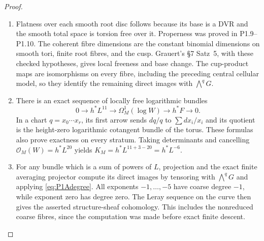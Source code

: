 \begin{proof}
\begin{enumerate}[label=\arabic*.]
\item Flatness over each smooth root disc follows because its base is a
DVR and the smooth total space is torsion free over it. Properness
was proved in P1.9--P1.10. The coherent fibre dimensions are the
constant binomial dimensions on smooth tori, finite root fibres,
and the cusp. Grauert's \S7 Satz~5, with these checked hypotheses,
gives local freeness and base change. The cup-product maps are
isomorphisms on every fibre, including the preceding central
cellular model, so they identify the remaining direct images with
$\bigwedge^qG$.

\item There is an exact sequence of locally free logarithmic bundles
\begin{equation}\label{eq:P1Alogcotangent}
0\longrightarrow h^*L^{11}\longrightarrow\Omega_M^1(\log W)
 \longrightarrow h^*F\longrightarrow0.
\end{equation}
In a chart $q=x_0\cdots x_r$, its first arrow sends
$dq/q$ to $\sum dx_i/x_i$ and its quotient is the height-zero
logarithmic cotangent bundle of the torus. These formulas also
prove exactness on every stratum. Taking determinants and
cancelling $\mathcal O_M(W)=h^*L^{20}$ yields
$K_M=h^*L^{11+3-20}=h^*L^{-6}$.

\item For any bundle which is a sum of powers of $L$, projection and
the exact finite averaging projector compute its direct images
by tensoring with $\bigwedge^qG$ and applying
\eqref{eq:P1Adegree}. All exponents $-1,\ldots,-5$ have coarse
degree $-1$, while exponent zero has degree zero. The Leray
sequence on the curve then gives the asserted structure-sheaf
cohomology. This includes the nonreduced coarse fibres, since
the computation was made before exact finite descent.

\end{enumerate}
\end{proof}




